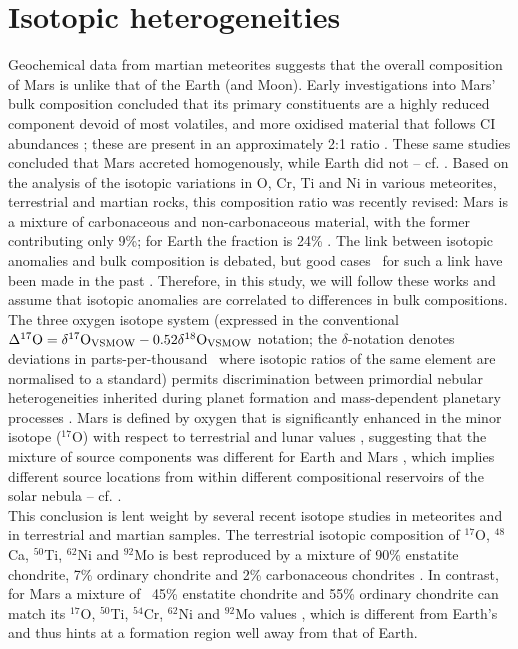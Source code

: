 \documentclass[preprint,5p,times,authoryear]{elsarticle}
\begin{document}
\section{Isotopic heterogeneities}
Geochemical data from martian meteorites suggests that the overall composition of Mars is unlike that of the Earth (and Moon). Early 
investigations into Mars' bulk composition concluded that its primary constituents are a highly reduced component devoid of most 
volatiles, and more oxidised material that follows CI abundances \citep{WD88}; these are present in an approximately 2:1 ratio 
\citep{WD94}. These same studies concluded that Mars accreted homogenously, while Earth did not -- cf. \citet{D04}. Based on the 
analysis of the isotopic variations in O, Cr, Ti and Ni in various meteorites, terrestrial and martian rocks, this composition ratio 
was recently revised: Mars is a mixture of carbonaceous and non-carbonaceous material, with the former contributing only 9\%; for 
Earth the fraction is 24\% \citep{War11}. The link between isotopic anomalies and bulk composition is debated, but good cases 
{\ for such a link have been made in the past} \citep{War11,D14,D15}. Therefore, in this study, we will follow these works and 
assume that isotopic anomalies are correlated to differences in bulk compositions. \\

The three oxygen isotope system (expressed in the conventional $\Delta ^{17}{\rm O}=\delta ^{17}{\rm O}_{\rm VSMOW}-0.52\delta 
^{18}{\rm O}_{\rm VSMOW}$ notation; the $\delta$-notation denotes deviations in parts-per-thousand {\ where isotopic ratios of the 
same element are normalised to a standard}) permits discrimination between primordial nebular heterogeneities inherited during planet 
formation and mass-dependent planetary processes \citep{CM83}. Mars is defined by oxygen that is significantly enhanced in the minor 
isotope ($^{17}$O) with respect to terrestrial and lunar values \citep{IAF99,R11,Mit08,AG13,W15}, suggesting that the mixture of 
source components was different for Earth and Mars {\citep{WD88,WD94,L00,War11}}, which implies different source locations from 
within different compositional reservoirs of the solar nebula -- cf. \citet{FB16}.\\

This conclusion is lent weight by several recent isotope studies in meteorites and in terrestrial and martian samples. The terrestrial 
isotopic composition of $^{17}$O, $^{48}$Ca, $^{50}$Ti, $^{62}$Ni and $^{92}$Mo is best reproduced by a mixture of 90\% enstatite 
chondrite, 7\% ordinary chondrite and 2\% carbonaceous chondrites \citep{D14}. In contrast, for Mars a mixture of {\ 45\% enstatite 
chondrite and 55\% ordinary chondrite} can match its $^{17}$O, $^{50}$Ti, $^{54}$Cr, $^{62}$Ni and $^{92}$Mo values \citep{S99,TD14}, 
which is different from Earth's and thus hints at a formation region well away from that of Earth.\\
\end{document}
